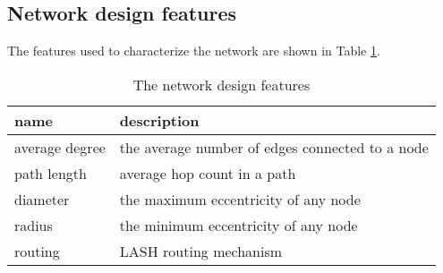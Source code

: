 \documentclass[12pt]{article}
\theoremstyle{definition}
\begin{document}
\subsection{Network design features}
The features used to characterize the network are shown in Table \ref{tab:features}.
\begin{table}[htb]
  \centering
  \begin{tabularx}{\textwidth}{|l|X|} \hline
    name & description \\ \hline
    average degree & the average number of edges connected to a node \\ \hline
    path length & average hop count in a path \\ \hline
    diameter & the maximum eccentricity of any node \\ \hline
    radius & the minimum eccentricity of any node \\ \hline
    routing & LASH routing mechanism \cite{skeie2002layered} \\ \hline
    
  \end{tabularx}
  \caption{The network design features}
  \label{tab:features}
\end{table}
\end{document}
